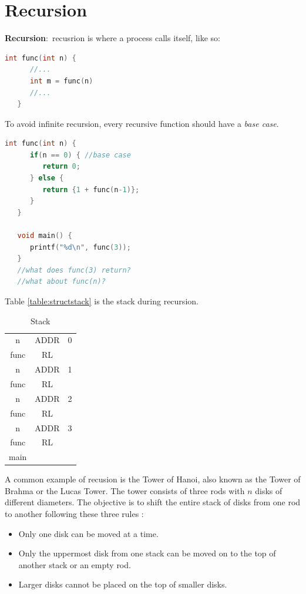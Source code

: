 \documentclass[nobib]{tufte-handout}
\newcommand{\defn}[2]{\noindent\textbf{#1}:\ #2}
\begin{document}
\section{Recursion}
\defn{Recursion}{recusrion is where a process calls itself}, like so:
\begin{lstlisting}[language=C,caption=recursion]
   int func(int n) {
      //...
      int m = func(n)
      //...
   }
\end{lstlisting}
To avoid infinite recursion, every recursive function should 
have a \emph{base case}. 
\begin{lstlisting}[language=C,caption=recursion]
   int func(int n) {
      if(n == 0) { //base case
         return 0;
      } else {
         return {1 + func(n-1)};
      }
   }

   void main() {
      printf("%d\n", func(3));
   }
   //what does func(3) return?
   //what about func(n)?
\end{lstlisting}
Table \ref{table:structstack} is the stack during recursion. 
\begin{table}[h]
   \centering
   \caption{Stack}
   \label{table:stackrecur}
   \begin{tabular}{|c c c|}
      \hline
      n & ADDR & 0 \\
      func & RL & \\
      \hline
      n & ADDR & 1 \\
      func & RL & \\
      \hline
      n & ADDR & 2 \\
      func & RL & \\
      \hline
      n & ADDR & 3 \\
      func & RL & \\
      \hline
      main & & \\
      \hline
   \end{tabular}
\end{table}
A common example of recusion is the Tower of Hanoi, 
also known as the Tower of Brahma or the Lucas Tower. 
The tower consists of three 
rods with $n$ disks of different diameters.
The objective is to shift the entire 
stack of disks from one rod to another 
following these three rules :
\begin{itemize}
   \item Only one disk can be moved at a time.
   \item Only the uppermost disk from one stack 
   can be moved on to the top of another stack or an empty rod.
   \item Larger disks cannot be placed on the top of smaller disks.
\end{itemize}
\end{document}
